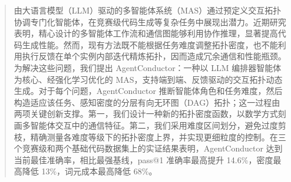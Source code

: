 \documentclass{article}
\theoremstyle{definition}
\begin{document}
\begin{abstract}
  由大语言模型（LLM）驱动的多智能体系统（MAS）通过预定义交互拓扑协调专门化智能体，在竞赛级代码生成等复杂任务中展现出潜力。近期研究表明，精心设计的多智能体工作流和通信图能够利用协作推理，显著提高代码生成性能。然而，现有方法既不能根据任务难度调整拓扑密度，也不能利用执行反馈在单个实例内部迭代精炼拓扑，因而造成冗余通信和性能瓶颈。为解决这些问题，我们提出 AgentConductor：一种以 LLM 编排器智能体为核心、经强化学习优化的 MAS，支持端到端、反馈驱动的交互拓扑动态生成。对于每个问题，AgentConductor 推断智能体角色和任务难度，然后构造适应该任务、感知密度的分层有向无环图（DAG）拓扑；这一过程由两项关键创新支撑。第一，我们设计一种新的拓扑密度函数，以数学方式刻画多智能体交互中的通信特征。第二，我们采用难度区间划分，避免过度剪枝，精确测量各难度等级下的拓扑密度上界，并实现更细粒度的控制。在三个竞赛级和两个基础代码数据集上的实证结果表明，AgentConductor 达到当前最佳准确率，相比最强基线，pass@1 准确率最高提升 14.6\%，密度最高降低 13\%，词元成本最高降低 68\%。
\end{abstract}
\end{document}
